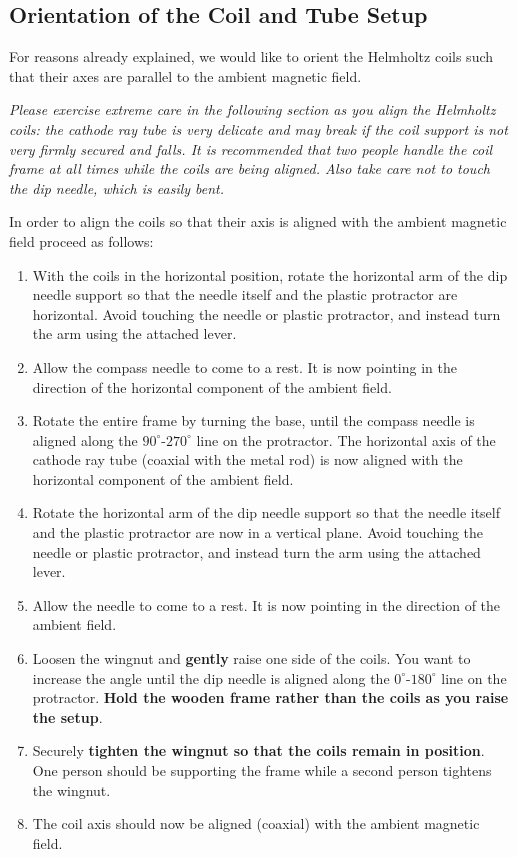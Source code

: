 \subsection{Orientation of the Coil and Tube Setup}

For reasons already explained, we would like to orient the Helmholtz coils such that their axes are parallel to the ambient magnetic field.\myskip

\emph{Please exercise extreme care in the following section as you align the Helmholtz coils: the cathode ray tube is very delicate and may break if the coil support is not very firmly secured and falls.  It is recommended that two people handle the coil frame at all times while the coils are being aligned.  Also take care not to touch the dip needle, which is easily bent.}\myskip

In order to align the coils so that their axis is aligned with the ambient magnetic field proceed as follows:
\begin{enumerate}
    \item With the coils in the horizontal position, rotate the horizontal arm of the dip needle support so that the needle itself and the plastic protractor are horizontal.  Avoid touching the needle or plastic protractor, and instead turn the arm using the attached lever.
    \item Allow the compass needle to come to a rest.  It is now pointing in the direction of the horizontal component of the ambient field.
    \item Rotate the entire frame by turning the base, until the compass needle is aligned along the $90^\circ$-$270^\circ$ line on the protractor.  The horizontal axis of the cathode ray tube (coaxial with the metal rod) is now aligned with the horizontal component of the ambient field.
    \item Rotate the horizontal arm of the dip needle support so that the needle itself and the plastic protractor are now in a vertical plane.  Avoid touching the needle or plastic protractor, and instead turn the arm using the attached lever.
    \item Allow the needle to come to a rest.  It is now pointing in the direction of the ambient field.
    \item Loosen the wingnut and \textbf{gently} raise one side of the coils.  You want to increase the angle until the dip needle is aligned along the $0^\circ$-$180^\circ$ line on the protractor.  \textbf{Hold the wooden frame rather than the coils as you raise the setup}.
    \item Securely \textbf{tighten the wingnut so that the coils remain in position}.  One person should be supporting the frame while a second person tightens the wingnut.
    \item The coil axis should now be aligned (coaxial) with the ambient magnetic field.
\end{enumerate}

